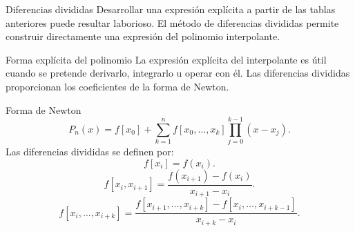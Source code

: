 \documentclass[main.tex]{subfiles}
\begin{document}
\begin{frame}[t]{Diferencias divididas}
Desarrollar una expresión explícita a partir de las tablas anteriores puede resultar laborioso.
\bigskip
El método de diferencias divididas permite construir directamente una expresión del polinomio interpolante.
\end{frame}
\begin{frame}[t]{Forma explícita del polinomio}
La expresión explícita del interpolante es útil cuando se pretende derivarlo, integrarlo u operar con él.
\bigskip
Las diferencias divididas proporcionan los coeficientes de la forma de Newton.
\end{frame}
\begin{frame}[t]{Forma de Newton}
\small\[P_n(x)=f[x_0]+\sum_{k=1}^n f[x_0,\ldots,x_k]\prod_{j=0}^{k-1}(x-x_j).\]Las diferencias divididas se definen por:\[f[x_i]=f(x_i).\]\[f[x_i,x_{i+1}]=\frac{f(x_{i+1})-f(x_i)}{x_{i+1}-x_i}.\]\[f[x_i,\ldots,x_{i+k}]=\frac{f[x_{i+1},\ldots,x_{i+k}]-f[x_i,\ldots,x_{i+k-1}]}{x_{i+k}-x_i}.\]
\end{frame}
\end{document}
